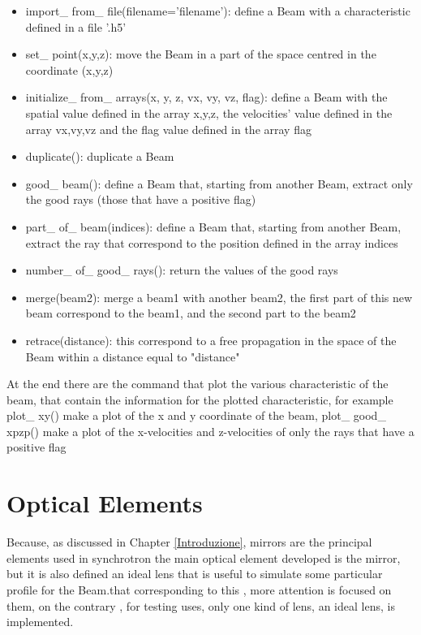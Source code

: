 \begin{itemize}
\item import\_ from\_ file(filename='filename'): define a Beam with a characteristic defined in a file '.h5'
\item set\_ point(x,y,z): move the Beam in a part of the space centred in the coordinate (x,y,z)
\item initialize\_ from\_ arrays(x, y, z, vx, vy, vz, flag): define a Beam with the spatial value defined in the array x,y,z, the velocities' value defined in the array vx,vy,vz and the flag value defined in the array flag
\item duplicate(): duplicate a Beam
\item good\_ beam(): define a Beam that, starting from another Beam, extract only the good rays (those that have a positive flag)
\item part\_ of\_ beam(indices): define a Beam that, starting from another Beam, extract the ray that correspond to the position defined in the array indices
\item number\_ of\_ good\_ rays(): return the values of the good rays
\item merge(beam2): merge a beam1 with another beam2, the first part of this new beam correspond to the beam1, and the second part to the beam2
\item retrace(distance): this correspond to a free propagation in the space of the Beam within a distance equal to "distance" 
\end{itemize}
At the end there are the command that plot the various characteristic of the beam, that contain the information for the plotted characteristic, for example plot\_ xy() make a plot of the x and y coordinate of the beam, plot\_ good\_ xpzp() make a plot of the x-velocities and z-velocities of only the rays that have a positive flag


\section{Optical Elements}
Because, as discussed in Chapter \ref{Introduzione}, mirrors are the principal elements used in synchrotron the main optical element developed is the mirror, but it is also defined an ideal lens that is useful to simulate some particular profile for the Beam.that corresponding to this , more attention is focused on them, on the contrary , for testing uses, only one kind of lens, an ideal lens, is implemented. 
